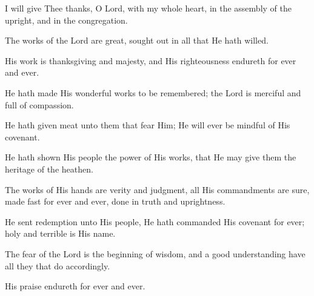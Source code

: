 I will give Thee thanks, O Lord, with my whole heart, in the assembly of the upright, and in the congregation.

The works of the Lord are great, sought out in all that He hath willed.

His work is thanksgiving and majesty, and His righteousness endureth for ever and ever.

He hath made His wonderful works to be remembered; the Lord is merciful and full of compassion.

He hath given meat unto them that fear Him; He will ever be mindful of His covenant.

He hath shown His people the power of His works, that He may give them the heritage of the heathen.

The works of His hands are verity and judgment, all His commandments are sure, made fast for ever and ever, done in truth and uprightness.

He sent redemption unto His people, He hath commanded His covenant for ever; holy and terrible is His name.

The fear of the Lord is the beginning of wisdom, and a good understanding have all they that do accordingly.

His praise endureth for ever and ever.
